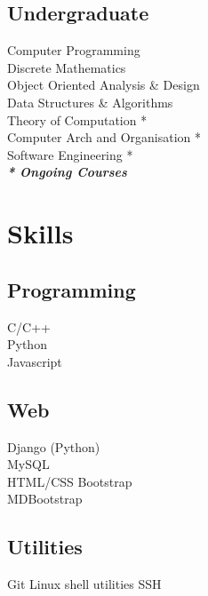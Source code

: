 \documentclass[]{deedy-resume-openfont}
\begin{document}
\begin{minipage}[t]{0.30\textwidth}

\subsection{Undergraduate}
Computer Programming \\
Discrete Mathematics \\
Object Oriented Analysis \& Design  \\
Data Structures \& Algorithms  \\
Theory of Computation * \\
Computer Arch and Organisation *\\
Software Engineering * \\

{\footnotesize \textit{\textbf{* Ongoing Courses}}}
\sectionsep


\section{Skills}
\subsection{Programming}
\textbullet{}   C/C++  \\
\textbullet{} Python \\
\textbullet{} Javascript 
\sectionsep

\subsection{Web}
\textbullet{} Django (Python) \\ \textbullet{} MySQL \\ 
\textbullet{} HTML/CSS \textbullet{} Bootstrap \\ 
\textbullet{} MDBootstrap \\
\sectionsep

\subsection{Utilities}
 \textbullet{} Git \textbullet{} Linux shell utilities \textbullet{} SSH
\sectionsep

\end{minipage}
\end{document}
